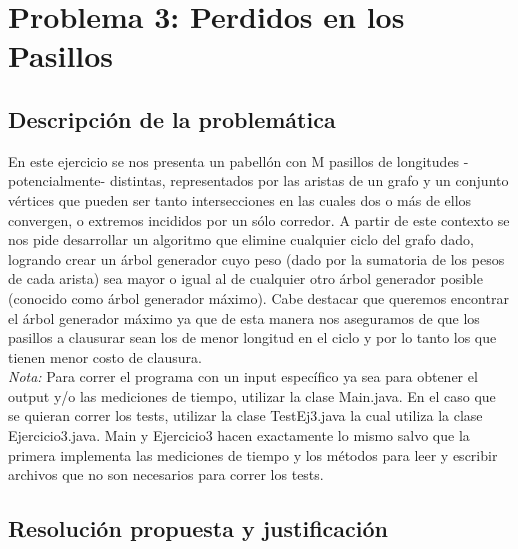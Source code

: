 \newpage
\section{Problema 3: Perdidos en los Pasillos}

\subsection{Descripción de la problemática}

En este ejercicio se nos presenta un pabellón con M pasillos de longitudes -potencialmente- distintas, representados por las aristas de un grafo y un conjunto vértices que pueden ser tanto intersecciones en las cuales dos o más de ellos convergen, o extremos incididos por un sólo corredor. 
A partir de este contexto se nos pide desarrollar un algoritmo que elimine cualquier ciclo del grafo dado, logrando crear un árbol generador cuyo peso (dado por la sumatoria de los pesos de cada arista) sea mayor o igual al de cualquier otro árbol generador posible (conocido como árbol generador máximo). Cabe destacar que queremos encontrar el árbol generador máximo ya que de esta manera nos aseguramos de que los pasillos a clausurar sean los de menor longitud en el ciclo y por lo tanto los que tienen menor costo de clausura.\\

\emph{Nota:} Para correr el programa con un input específico ya sea para obtener el output y/o las mediciones de tiempo, utilizar la clase Main.java. En el caso que se quieran correr los tests, utilizar la clase TestEj3.java la cual utiliza la clase Ejercicio3.java. Main y Ejercicio3 hacen exactamente lo mismo salvo que la primera implementa las mediciones de tiempo y los métodos para leer y escribir archivos que no son necesarios para correr los tests. 

\subsection{Resolución propuesta y justificación}

